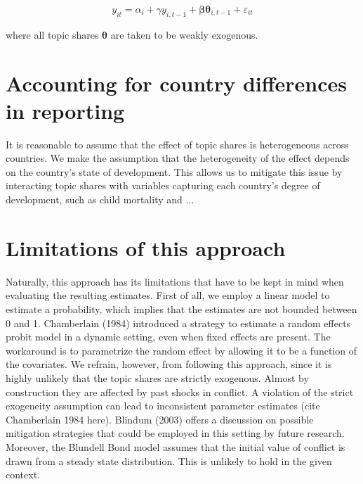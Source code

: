 \begin{equation}
    y_{it} = \alpha_i + \gamma y_{i, t-1} + \mathbf{\beta}\mathbf{\theta}_{i, t-1} + \varepsilon_{it}
\end{equation}

where all topic shares $\mathbf{\theta}$ are taken to be weakly exogenous.

\section{Accounting for country differences in reporting}
It is reasonable to assume that the effect of topic shares is heterogeneous across countries.
We make the assumption that the heterogeneity of the effect depends on the country's state of development.
This allows us to mitigate this issue by interacting topic shares with variables capturing each country's degree of development, such as child mortality and ...

\section{Limitations of this approach}
Naturally, this approach has its limitations that have to be kept in mind when evaluating the resulting estimates.
First of all, we employ a linear model to estimate a probability, which implies that the estimates are not bounded between 0 and 1.
Chamberlain (1984) introduced a strategy to estimate a random effects probit model in a dynamic setting, even when fixed effects are present.
The workaround is to parametrize the random effect by allowing it to be a function of the covariates.
We refrain, however, from following this approach, since it is highly unlikely that the topic shares are strictly exogenous.
Almost by construction they are affected by past shocks in conflict.
A violation of the strict exogeneity assumption can lead to inconsistent parameter estimates (cite Chamberlain 1984 here).
Blindum (2003) offers a discussion on possible mitigation strategies that could be employed in this setting by future research.
Moreover, the Blundell Bond model assumes that the initial value of conflict is drawn from a steady state distribution.
This is unlikely to hold in the given context.


\newpage

